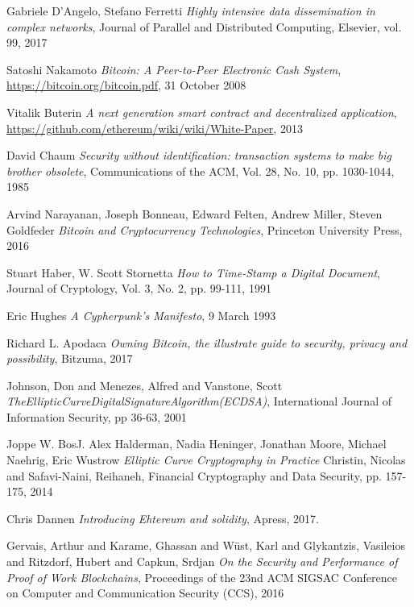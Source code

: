 \begin{thebibliography}{99}

 Gabriele D'Angelo, Stefano Ferretti
{\em Highly intensive data dissemination in complex networks},
Journal of Parallel and Distributed Computing, Elsevier, vol. 99, 2017

 Satoshi Nakamoto
{\em Bitcoin: A Peer-to-Peer Electronic Cash System},
\url{https://bitcoin.org/bitcoin.pdf}, 31 October 2008

 Vitalik Buterin
{\em A next generation smart contract and decentralized application},
\url{https://github.com/ethereum/wiki/wiki/White-Paper}, 2013

 David Chaum
{\em Security without identification: transaction systems to make big brother obsolete},
Communications of the ACM, Vol. 28, No. 10, pp. 1030-1044, 1985

 Arvind Narayanan, Joseph Bonneau, Edward Felten, Andrew Miller, Steven Goldfeder
{\em Bitcoin and Cryptocurrency Technologies},
Princeton University Press, 2016

 Stuart Haber, W. Scott Stornetta
{\em How to Time-Stamp a Digital Document},
Journal of Cryptology, Vol. 3, No. 2, pp. 99-111, 1991

 Eric Hughes
{\em A Cypherpunk's Manifesto},
9 March 1993

 Richard L. Apodaca
{\em Owning Bitcoin, the illustrate guide to security, privacy and possibility},
Bitzuma, 2017

 Johnson, Don and Menezes, Alfred and Vanstone, Scott
{\em TheEllipticCurveDigitalSignatureAlgorithm(ECDSA)},
International Journal of Information Security, pp 36-63, 2001

 Joppe W. BosJ. Alex Halderman, Nadia Heninger, Jonathan Moore, Michael Naehrig, Eric Wustrow
{\em Elliptic Curve Cryptography in Practice}
Christin, Nicolas and Safavi-Naini, Reihaneh, Financial Cryptography and Data Security, pp. 157-175, 2014

 Chris Dannen
{\em Introducing Ehtereum and solidity},
Apress, 2017.

 Gervais, Arthur and Karame, Ghassan and Wüst, Karl and Glykantzis, Vasileios and Ritzdorf, Hubert and Capkun, Srdjan
{\em On the Security and Performance of Proof of Work Blockchains},
Proceedings of the 23nd ACM SIGSAC Conference on Computer and Communication Security (CCS), 2016


\end{thebibliography}
